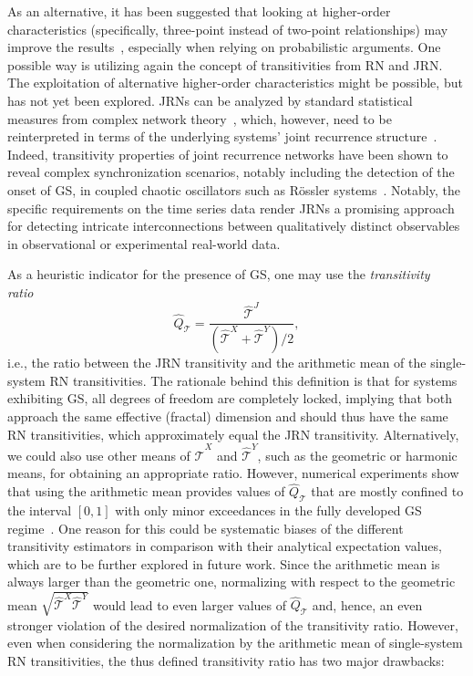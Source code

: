 		As an alternative, it has been suggested that looking at higher-order characteristics (specifically, three-point instead of two-point relationships) may improve the results~\cite{Feldhoff2013}, especially when relying on probabilistic arguments. One possible way is utilizing again the concept of transitivities from RN and JRN. The exploitation of alternative higher-order characteristics might be possible, but has not yet been explored. JRNs can be analyzed by standard statistical measures from complex network theory~\cite{Newman2003,Donner2010b}, which, however, need to be reinterpreted in terms of the underlying systems' joint recurrence structure~\cite{Feldhoff2011,Feldhoff2012,Donner2012}. Indeed, transitivity properties of joint recurrence networks have been shown to reveal complex synchronization scenarios, notably including the detection of the onset of GS, in coupled chaotic oscillators such as R\"ossler systems~\cite{Feldhoff2012}. Notably, the specific requirements on the time series data render JRNs a promising approach for detecting intricate interconnections between qualitatively distinct observables in observational or experimental real-world data.

		As a heuristic indicator for the presence of GS, one may use the \emph{transitivity ratio}~\cite{Feldhoff2013}
\begin{equation}
\hat{Q}_{\mathcal{T}}=\frac{\hat{\mathcal{T}}^J}{(\hat{\mathcal{T}}^X+\hat{\mathcal{T}}^Y)/2},
\label{eq:qt}
\end{equation}
\noindent
i.e., the ratio between the JRN transitivity and the arithmetic mean of the single-system RN transitivities. The rationale behind this definition is that for systems exhibiting GS, all degrees of freedom are completely locked, implying that both approach the same effective (fractal) dimension and should thus have the same RN transitivities, which approximately equal the JRN transitivity. Alternatively, we could also use other means of $\hat{\mathcal{T}}^{X}$ and $\hat{\mathcal{T}}^{Y}$, such as the geometric or harmonic means, for obtaining an appropriate ratio. However, numerical experiments show that using the arithmetic mean provides values of $\hat{Q}_{\mathcal{T}}$ that are mostly confined to the interval $[0,1]$ with only minor exceedances in the fully developed GS regime~\cite{Feldhoff2013}. One reason for this could be systematic biases of the different transitivity estimators in comparison with their analytical expectation values, which are to be further explored in future work. Since the arithmetic mean is always larger than the geometric one, normalizing with respect to the geometric mean $\sqrt{\hat{\mathcal{T}}^X \hat{\mathcal{T}}^Y}$ would lead to even larger values of $\hat{Q}_{\mathcal{T}}$ and, hence, an even stronger violation of the desired normalization of the transitivity ratio. However, even when considering the normalization by the arithmetic mean of single-system RN transitivities, the thus defined transitivity ratio has two major drawbacks:

